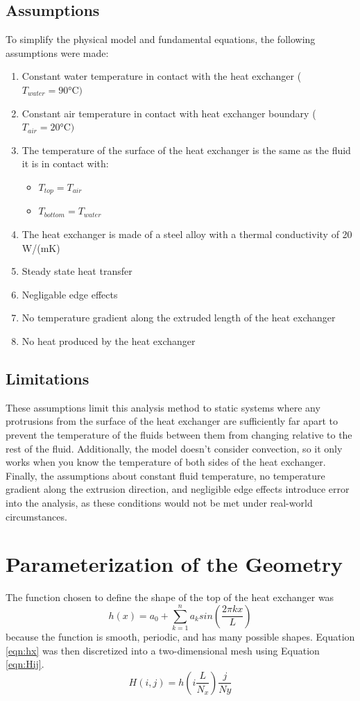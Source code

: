 \documentclass[11pt]{article}%
\begin{document}
\subsection{Assumptions}
\label{sec:assumption}
To simplify the physical model and fundamental equations, the following assumptions were made:
\begin{enumerate}
   	 \item Constant water temperature in contact with the heat exchanger ($T_{water}=90\si{\degreeCelsius)}$
    	\item Constant air temperature in contact with heat exchanger boundary ($T_{air}=20\si{\degreeCelsius)}$
	\item The temperature of the surface of the heat exchanger is the same as the fluid it is in contact with:
	\begin{itemize}
		\item $T_{top}=T_{air}$
		\item $T_{bottom}=T_{water}$
	\end{itemize}
	\item The heat exchanger is made of a steel alloy with a thermal conductivity of 20 W/(mK)
	\item Steady state heat transfer
	\item Negligable edge effects
	\item  No temperature gradient along the extruded length of the heat exchanger
	\item No heat produced by the heat exchanger
\end{enumerate}
\subsection{Limitations}
These assumptions limit this analysis method to static systems where any protrusions from the surface of the heat exchanger are sufficiently far apart to prevent the temperature of the fluids between them from changing relative to the rest of the fluid. Additionally, the model doesn’t consider convection, so it only works when you know the temperature of both sides of the heat exchanger. Finally, the assumptions about constant fluid temperature, no temperature gradient along the extrusion direction, and negligible edge effects introduce error into the analysis, as these conditions would not be met under real-world circumstances.
\section{Parameterization of the Geometry}
\label{sec:parameterization}
The function chosen to define the shape of the top of the heat exchanger was
\begin{equation}
\label{eqn:hx}
h(x)=a_{0} +\sum_{k=1}^{n}a_{k}sin(\frac{2\pi kx}{L})
\end{equation}
because the function is smooth, periodic, and has many possible shapes. Equation \ref{eqn:hx} was then discretized into a two-dimensional mesh using Equation \ref{eqn:Hij}. 
\begin{equation}
\label{eqn:Hij}
H(i,j)=h(i\frac{L}{N_{x}})\frac{j}{Ny}
\end{equation}
\end{document}
